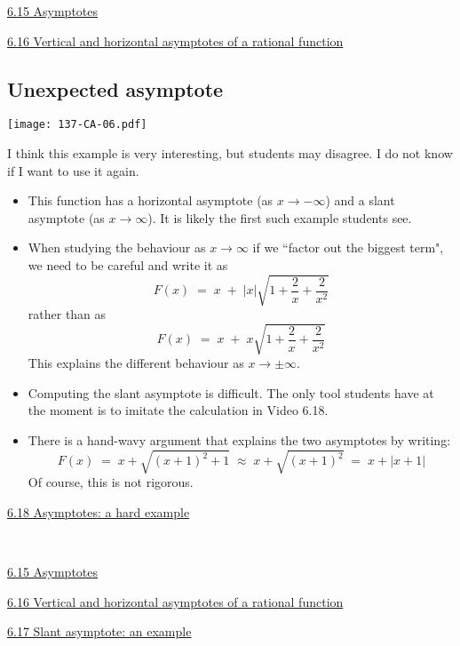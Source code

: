 \documentclass[11pt]{article}
\newcommand{\nl}{\hfill \vspace{-1.1\baselineskip}} %
\newcommand{\vxv}{\hspace{8mm} \href{https://www.youtube.com/watch?v=PG41kUSC0w0&list=PLlwePzQY_wW9EsqbQzPdJTNGsHYvO_2CJ&index=15}{6.15 Asymptotes}}
\newcommand{\vxvi}{\hspace{8mm} \href{https://www.youtube.com/watch?v=gzoTke-bby4&list=PLlwePzQY_wW9EsqbQzPdJTNGsHYvO_2CJ&index=16}{6.16 Vertical and horizontal asymptotes of a rational function}}
\newcommand{\vxvii}{\hspace{8mm} \href{https://www.youtube.com/watch?v=UTFOz-4GZYs&list=PLlwePzQY_wW9EsqbQzPdJTNGsHYvO_2CJ&index=17}{6.17 Slant asymptote: an example}}
\newcommand{\vxviii}{\hspace{8mm} \href{https://www.youtube.com/watch?v=5Obe9JUFtEg&list=PLlwePzQY_wW9EsqbQzPdJTNGsHYvO_2CJ&index=18}{6.18 Asymptotes: a hard example}}
\begin{document}
\begin{videos}
\vxv

\vxvi

\end{videos}

\newpage
\subsection{Unexpected asymptote}

\begin{center}
{ \texttt{[image: 137-CA-06.pdf]}} 
\end{center}

\begin{warning}
	I think this example is very interesting, but students may disagree.  I do not know if I want to use it again.
\end{warning}

\begin{comments}
\nl
	\begin{itemize}
		\item  This function has a horizontal asymptote (as $x \to -\infty$) and a slant asymptote (as $x \to \infty$).  It is likely the first such example students see.
		\item  When studying the behaviour as $x \to \infty$ if we ``factor out the biggest term", we need to be careful and write it as 
			$$
				F(x) \; = \; x \; + \; |x| \sqrt{1 + \frac{2}{x} + \frac{2}{x^2}}
			$$
			rather than as 
			$$
				F(x) \; = \; x \; + \; x \sqrt{1 + \frac{2}{x} + \frac{2}{x^2}}
			$$
			This explains the different behaviour as $x \to \pm \infty$.
			
		\item Computing the slant asymptote is difficult.  The only tool students have at the moment is to imitate the calculation in Video 6.18.
		
		\item There is a hand-wavy argument that explains the two asymptotes by writing:
			$$
				F(x) \; = \; x + \sqrt{(x+1)^2 + 1} \; \approx \; x + \sqrt{(x+1)^2} \; = \; x + |x+1|
			$$
			Of course, this is not rigorous.
	\end{itemize}
\end{comments}

\begin{videos}
\vxviii

\

\vxv

\vxvi

\vxvii
\end{videos}
\end{document}
